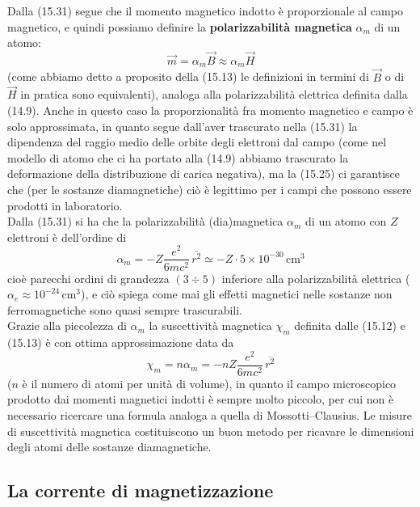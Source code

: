 Dalla (15.31) segue che il momento magnetico indotto \`e proporzionale al campo
magnetico, e quindi possiamo definire la \textbf{polarizzabilit\`a magnetica}
$\alpha_m$ di un atomo:
\begin{equation}
  \vec m=\alpha_m\vec B\approx\alpha_m\vec H
  \tag{15.32}
\end{equation}
(come abbiamo detto a proposito della (15.13) le definizioni in termini di
$\vec B$ o di $\vec H$ in pratica sono equivalenti), analoga alla
polarizzabilit\`a elettrica definita dalla (14.9). Anche in questo caso la
proporzionalit\`a fra momento magnetico e campo \`e solo approssimata, in quanto
segue dall'aver trascurato nella (15.31) la dipendenza del raggio medio delle
orbite degli elettroni dal campo (come nel modello di atomo che ci ha portato
alla (14.9) abbiamo trascurato la deformazione della distribuzione di carica
negativa), ma la (15.25) ci garantisce che (per le sostanze diamagnetiche) ci\`o
\`e legittimo per i campi che possono essere prodotti in laboratorio.\\
Dalla (15.31) si ha che la polarizzabilit\`a (dia)magnetica $\alpha_m$ di un
atomo con $Z$ elettroni \`e dell'ordine di
\begin{equation}
  \alpha_m=-Z\frac{e^2}{6mc^2}\,\overline{r^2}
  \simeq-Z\cdot5\times10^{-30}\,\mathrm{cm}^3
  \tag{15.33}
\end{equation}
cio\`e parecchi ordini di grandezza $(3\div5)$ inferiore alla polarizzabilit\`a
elettrica ($\alpha_e\approx10^{-24}\,\mathrm{cm}^3$), e ci\`o spiega come mai
gli effetti magnetici nelle sostanze non ferromagnetiche sono quasi sempre
trascurabili.\\
Grazie alla piccolezza di $\alpha_m$ la suscettivit\`a magnetica $\chi_m$
definita dalle (15.12) e (15.13) \`e con ottima approssimazione data da
\begin{equation}
  \chi_m=n\alpha_m=-nZ\frac{e^2}{6mc^2}\,\overline{r^2}
  \tag{15.34}
\end{equation}
($n$ \`e il numero di atomi per unit\`a di volume), in quanto il campo
microscopico prodotto dai momenti magnetici indotti \`e sempre molto piccolo,
per cui non \`e necessario ricercare una formula analoga a quella di
Mossotti--Clausius. Le misure di suscettivit\`a magnetica costituiscono un buon
metodo per ricavare le dimensioni degli atomi delle sostanze diamagnetiche.

\subsection{La corrente di magnetizzazione}

